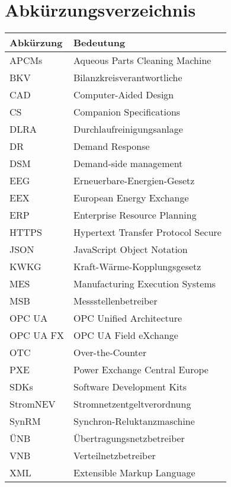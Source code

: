 \chapter*{Abkürzungsverzeichnis}
\begin{spacing}{1.5}
\setlength\LTleft{15pt}
\setlength\LTright{\fill}
\begin{longtable}{ll}
    \textbf{Abkürzung}				&\textbf{Bedeutung}	\\\midrule\endhead
    APCMs							&Aqueous Parts Cleaning Machine\\
    BKV								&Bilanzkreisverantwortliche\\
    CAD								&Computer-Aided Design\\
    CS								&Companion Specifications\\
   	DLRA							&Durchlaufreinigungsanlage\\
   	DR								&Demand Response\\
   	DSM								&Demand-side management\\
   	EEG								&Erneuerbare-Energien-Gesetz\\
    EEX								&European Energy Exchange\\
    ERP								&Enterprise Resource Planning\\
    HTTPS							&Hypertext Transfer Protocol Secure\\
    JSON							&JavaScript Object Notation\\
    KWKG							&Kraft-Wärme-Kopplungsgesetz\\
    MES								&Manufacturing Execution Systems\\
    MSB								&Messstellenbetreiber\\
    OPC UA							&OPC Unified Architecture\\
    OPC UA FX						&OPC UA Field eXchange\\
    OTC								&Over-the-Counter\\
    PXE								&Power Exchange Central Europe\\
    SDKs							&Software Development Kits\\
    StromNEV						&Stromnetzentgeltverordnung\\
	SynRM							&Synchron-Reluktanzmaschine\\
	ÜNB								&Übertragungsnetzbetreiber\\
	VNB								&Verteilnetzbetreiber\\
	XML								&Extensible Markup Language\\

  \end{longtable}
\end{spacing}

                    